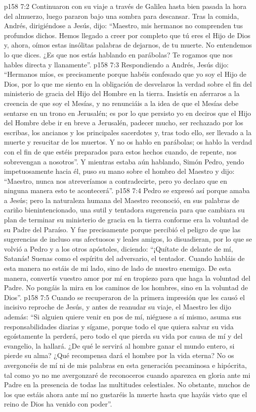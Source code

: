 \vs p158 7:2 Continuaron con su viaje a través de Galilea hasta bien pasada la hora del almuerzo, luego pararon bajo una sombra para descansar. Tras la comida, Andrés, dirigiéndose a Jesús, dijo: “Maestro, mis hermanos no comprenden tus profundos dichos. Hemos llegado a creer por completo que tú eres el Hijo de Dios y, ahora, oímos estas insólitas palabras de dejarnos, de tu muerte. No entendemos lo que dices. ¿Es que nos estás hablando en parábolas? Te rogamos que nos hables directa y llanamente”.
\vs p158 7:3 Respondiendo a Andrés, Jesús dijo: “Hermanos míos, es precisamente porque habéis confesado que yo soy el Hijo de Dios, por lo que me siento en la obligación de desvelaros la verdad sobre el fin del ministerio de gracia del Hijo del Hombre en la tierra. Insistís en aferraros a la creencia de que soy el Mesías, y no renunciáis a la idea de que el Mesías debe sentarse en un trono en Jerusalén; es por lo que persisto yo en deciros que el Hijo del Hombre debe ir en breve a Jerusalén, padecer mucho, ser rechazado por los escribas, los ancianos y los principales sacerdotes y, tras todo ello, ser llevado a la muerte y resucitar de los muertos. Y no os hablo en parábolas; os hablo la verdad con el fin de que estéis preparados para estos hechos cuando, de repente, nos sobrevengan a nosotros”. Y mientras estaba aún hablando, Simón Pedro, yendo impetuosamente hacia él, puso su mano sobre el hombro del Maestro y dijo: “Maestro, nunca nos atreveríamos a contradecirte, pero yo declaro que en ninguna manera esto te acontecerá”.
\vs p158 7:4 Pedro se expresó así porque amaba a Jesús; pero la naturaleza humana del Maestro reconoció, en sus palabras de cariño bienintencionado, una sutil y tentadora sugerencia para que cambiara su plan de terminar su ministerio de gracia en la tierra conforme era la voluntad de su Padre del Paraíso. Y fue precisamente porque percibió el peligro de que las sugerencias de incluso sus afectuosos y leales amigos, lo disuadieran, por lo que se volvió a Pedro y a los otros apóstoles, diciendo: “¡Quítate de delante de mí, Satanás! Suenas como el espíritu del adversario, el tentador. Cuando habláis de esta manera no estáis de mi lado, sino de lado de nuestro enemigo. De esta manera, convertís vuestro amor por mí en tropiezo para que haga la voluntad del Padre. No pongáis la mira en los caminos de los hombres, sino en la voluntad de Dios”.
\vs p158 7:5 Cuando se recuperaron de la primera impresión que les causó el incisivo reproche de Jesús, y antes de reanudar su viaje, el Maestro les dijo además: “Si alguien quiere venir en pos de mí, niéguese a sí mismo, asuma sus responsabilidades diarias y sígame, porque todo el que quiera salvar su vida egoístamente la perderá, pero todo el que pierda su vida por causa de mí y del evangelio, la hallará. ¿De qué le servirá al hombre ganar el mundo entero, si pierde su alma? ¿Qué recompensa dará el hombre por la vida eterna? No os avergoncéis de mí ni de mis palabras en esta generación pecaminosa e hipócrita, tal como yo no me avergonzaré de reconoceros cuando aparezca en gloria ante mi Padre en la presencia de todas las multitudes celestiales. No obstante, muchos de los que estáis ahora ante mí no gustaréis la muerte hasta que hayáis visto que el reino de Dios ha venido con poder”.
